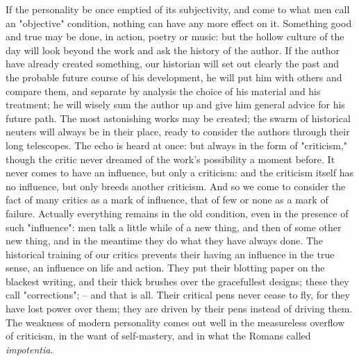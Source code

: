 If the personality be once emptied of its subjectivity, and come to
what men call an "objective" condition, nothing can have any more
effect on it. Something good and true may be done, in action, poetry
or music: but the hollow culture of the day will look beyond the work
and ask the history of the author. If the author have already created
something, our historian will set out clearly the past and the
probable future course of his development, he will put him with
others and compare them, and separate by analysis the choice of his
material and his treatment; he will wisely sum the author up and give
him general advice for his future path. The most astonishing works
may be created; the swarm of historical neuters will always be in
their place, ready to consider the authors through their long
telescopes. The echo is heard at once: but always in the form of
"criticism," though the critic never dreamed of the work's
possibility a moment before. It never comes to have an influence, but
only a criticism: and the criticism itself has no influence, but only
breeds another criticism. And so we come to consider the fact of many
critics as a mark of influence, that of few or none as a mark of
failure. Actually everything remains in the old condition, even in
the presence of such "influence": men talk a little while of a new
thing, and then of some other new thing, and in the meantime they do
what they have always done. The historical training of our critics
prevents their having an influence in the true sense, an influence on
life and action. They put their blotting paper on the blackest
writing, and their thick brushes over the gracefullest designs; these
they call "corrections"; -- and that is all. Their critical pens never
cease to fly, for they have lost power over them; they are driven by
their pens instead of driving them. The weakness of modern
personality comes out well in the measureless overflow of criticism,
in the want of self-mastery, and in what the Romans called
\textit{impotentia}.

